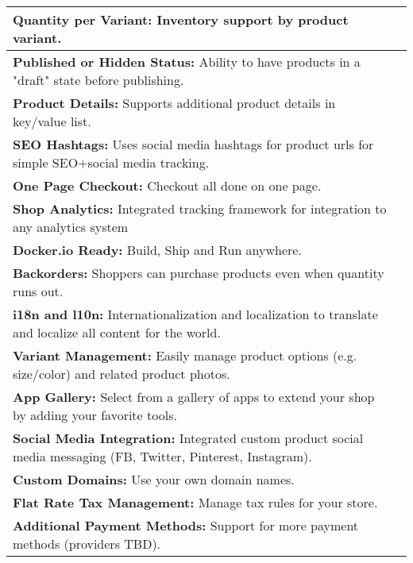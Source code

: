 \begin{table}[h!]
\begin{tabular}{ |L{0.6\paperwidth}|L{0.1\paperwidth}|}
\\ \hline
	\textbf{ Quantity per Variant:} Inventory support by product variant.&
	
\\ \hline
	\textbf{ Published or Hidden Status:} Ability to have products in a "draft" state before publishing.&
	
\\ \hline
	\textbf{ Product Details:} Supports additional product details in key/value list.&
	
\\ \hline
	\textbf{ SEO Hashtags:} Uses social media hashtags for product urls for simple SEO+social media tracking.&
	
\\ \hline
	\textbf{ One Page Checkout:} Checkout all done on one page.&
	
\\ \hline
	\textbf{ Shop Analytics:} Integrated tracking framework for integration to any analytics system&
	
\\ \hline
	\textbf{ Docker.io Ready:} Build, Ship and Run anywhere.&
	
\\ \hline
	 \textbf{ Backorders:} Shoppers can purchase products even when quantity runs out.&
	
\\ \hline
	\textbf{ i18n and l10n:} Internationalization and localization to translate and localize all content for the world.&
	
\\ \hline
	\textbf{ Variant Management:} Easily manage product options (e.g. size/color) and related product photos.&
	
\\ \hline
	\textbf{ App Gallery:} Select from a gallery of apps to extend your shop by adding your favorite tools.&
	
\\ \hline
	\textbf{ Social Media Integration:} Integrated custom product social media messaging (FB, Twitter, Pinterest, Instagram).&
	
\\ \hline
	\textbf{ Custom Domains:} Use your own domain names.&
	
\\ \hline
	\textbf{ Flat Rate Tax Management:} Manage tax rules for your store.&
	
\\ \hline
	\textbf{ Additional Payment Methods:} Support for more payment methods (providers TBD).&
	

\end{tabular}
\end{table}
